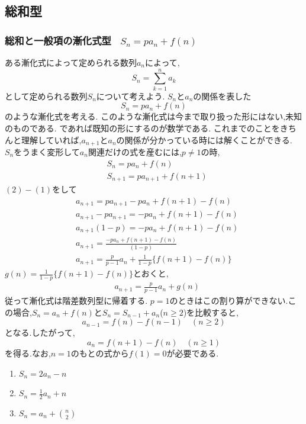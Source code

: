 
\subsection{総和型}\label{節：総和型}
  \subsubsection{\texorpdfstring{総和と一般項の漸化式型 \, $S_n=pa_n+f(n)$}{総和と一般項の漸化式型}}
    ある漸化式によって定められる数列$a_n$によって,
    \[
      S_n=\sum_{k=1}^{n} a_k
    \]
    として定められる数列$S_n$について考えよう.
    $S_n$と$a_n$の関係を表した
    \[
      S_n=pa_n+f(n)
    \]
    のような漸化式を考える.
    このような漸化式は今まで取り扱った形にはない,未知のものである.
    であれば既知の形にするのが数学である.
    これまでのことをきちんと理解していれば,$a_{n+1}$と$a_n$の関係が分かっている時には解くことができる.
    $S_n$をうまく変形して$a_{n}$関連だけの式を産むには,$p \neq 1$の時,
    \begin{align*}
      &S_n=pa_n+f(n) \tag*{\(\cdots\) (1)}\\
      &S_{n+1}=pa_{n+1}+f(n+1) \tag*{\(\cdots\) (2)}
    \end{align*}
    $(2)-(1)$をして
    \begin{align*}
      &a_{n+1}=pa_{n+1}-pa_n+f(n+1)-f(n)\\
      &a_{n+1}-pa_{n+1}=-pa_n+f(n+1)-f(n)\\
      &a_{n+1}(1-p)=-pa_n+f(n+1)-f(n)\\
      &a_{n+1}=\frac{-pa_n+f(n+1)-f(n)}{(1-p)}\\
      &a_{n+1}=\frac{p}{p-1}a_n+\frac{1}{1-p}\{f(n+1)-f(n)\}
    \end{align*}
    $\displaystyle g(n)=\frac{1}{1-p}\{f(n+1)-f(n)\}$とおくと,
    \begin{align*}
      &a_{n+1}=\frac{p}{p-1}a_n+g(n)
    \end{align*}
    従って漸化式は階差数列型に帰着する.
    $p=1$のときはこの割り算ができない.この場合,$S_n=a_n+f(n)$と$S_n=S_{n-1}+a_n$($n\ge2$)を比較すると,
    \[
      a_{n-1}=f(n)-f(n-1)\quad(n\ge2)
    \]
    となる.したがって,
    \[
      a_n=f(n+1)-f(n)\quad(n\ge1)
    \]
    を得る.なお,$n=1$のもとの式から$f(1)=0$が必要である.

    \noindent {}
    \begin{enumerate}[label=(\arabic*),parsep=3pt,format=\bookitemlink{example-summation-1}{problem}{answer}]
      \item $\displaystyle S_n=2a_n-n$
      \item $\displaystyle S_n=\frac12a_n+n$
      \item $\displaystyle S_n=a_n+\binom n2$
    \end{enumerate}

